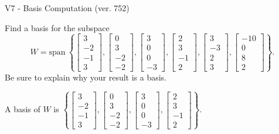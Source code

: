 \begin{exercise}
  \begin{exerciseTitle}V7 - Basis Computation (ver. 752)\end{exerciseTitle}
  \begin{exerciseStatement}
    Find a basis for the subspace 
\[W=\mathrm{span}\ \left\{\left[\begin{array}{r}
3 \\
-2 \\
-1 \\
3
\end{array}\right] , \left[\begin{array}{r}
0 \\
3 \\
-2 \\
-2
\end{array}\right] , \left[\begin{array}{r}
3 \\
0 \\
0 \\
-3
\end{array}\right] , \left[\begin{array}{r}
2 \\
3 \\
-1 \\
2
\end{array}\right] , \left[\begin{array}{r}
3 \\
-3 \\
2 \\
3
\end{array}\right] , \left[\begin{array}{r}
-10 \\
0 \\
8 \\
2
\end{array}\right]\right\}.\]
 Be sure to explain why your result is a basis.


  \end{exerciseStatement}
  \begin{exerciseAnswer}
   A basis of \(W\) is  \(\left\{\left[\begin{array}{r}
3 \\
-2 \\
-1 \\
3
\end{array}\right] , \left[\begin{array}{r}
0 \\
3 \\
-2 \\
-2
\end{array}\right] , \left[\begin{array}{r}
3 \\
0 \\
0 \\
-3
\end{array}\right] , \left[\begin{array}{r}
2 \\
3 \\
-1 \\
2
\end{array}\right]\right\}\).
  


  \end{exerciseAnswer}
\end{exercise}